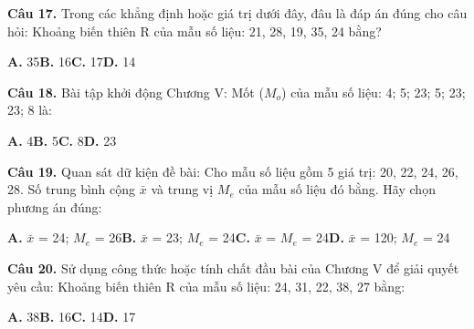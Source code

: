 \documentclass[11pt,a4paper]{article}
\begin{document}
\textbf{\color{primary} Câu 17.} Trong các khẳng định hoặc giá trị dưới đây, đâu là đáp án đúng cho câu hỏi: Khoảng biến thiên R của mẫu số liệu: 21, 28, 19, 35, 24 bằng?\par
\hspace*{1.5em}\textbf{A.} 35\quad\quad \textbf{B.} 16\quad\quad \textbf{C.} 17\quad\quad \textbf{D.} 14\par\vspace{2pt}
\textbf{\color{primary} Câu 18.} Bài tập khởi động Chương V: Mốt ($M_o$) của mẫu số liệu: 4; 5; 23; 5; 23; 23; 8 là:\par
\hspace*{1.5em}\textbf{A.} 4\quad\quad \textbf{B.} 5\quad\quad \textbf{C.} 8\quad\quad \textbf{D.} 23\par\vspace{2pt}
\textbf{\color{primary} Câu 19.} Quan sát dữ kiện đề bài: Cho mẫu số liệu gồm 5 giá trị: 20, 22, 24, 26, 28. Số trung bình cộng $\bar{x}$ và trung vị $M_e$ của mẫu số liệu đó bằng. Hãy chọn phương án đúng:\par
\hspace*{1.5em}\textbf{A.} $\bar{x}$ = 24; $M_e$ = 26\quad\quad \textbf{B.} $\bar{x}$ = 23; $M_e$ = 24\quad\quad \textbf{C.} $\bar{x}$ = $M_e$ = 24\quad\quad \textbf{D.} $\bar{x}$ = 120; $M_e$ = 24\par\vspace{2pt}
\textbf{\color{primary} Câu 20.} Sử dụng công thức hoặc tính chất đầu bài của Chương V để giải quyết yêu cầu: Khoảng biến thiên R của mẫu số liệu: 24, 31, 22, 38, 27 bằng:\par
\hspace*{1.5em}\textbf{A.} 38\quad\quad \textbf{B.} 16\quad\quad \textbf{C.} 14\quad\quad \textbf{D.} 17\par\vspace{2pt}
\end{document}
